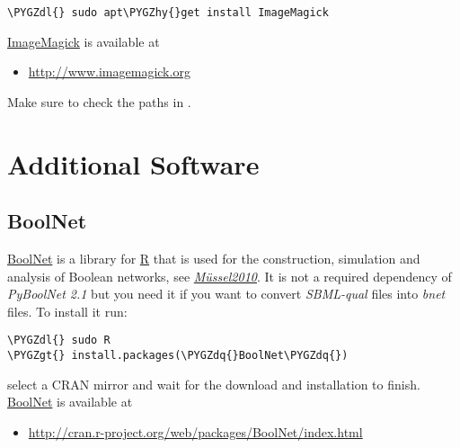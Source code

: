 \documentclass[letterpaper,10pt,english]{sphinxmanual}
\def\PYGZgt{\char`\>}
\def\PYGZdl{\char`\$}
\def\PYGZhy{\char`\-}
\def\PYGZdq{\char`\"}
\begin{document}
\begin{Verbatim}[commandchars=\\\{\}]
\PYGZdl{} sudo apt\PYGZhy{}get install ImageMagick
\end{Verbatim}

\href{http://www.imagemagick.org/script/index.php}{ImageMagick} is available at
\begin{itemize}
\item {} 
\href{http://www.imagemagick.org}{http://www.imagemagick.org}

\end{itemize}

Make sure to check the paths in .


\section{Additional Software}
\label{Installation:additional-software}

\subsection{BoolNet}
\label{Installation:boolnet}\label{Installation:installation-boolnet}
\href{https://cran.r-project.org/web/packages/BoolNet/index.html}{BoolNet} is a library for \href{https://www.r-project.org/}{R} that is used for the construction, simulation and analysis of Boolean networks, see {\hyperref[Bibliography:mussel2010]{\emph{Müssel2010}}}.
It is not a required dependency of \emph{PyBoolNet 2.1} but you need it if you want to convert \emph{SBML-qual} files into \emph{bnet} files.
To install it run:

\begin{Verbatim}[commandchars=\\\{\}]
\PYGZdl{} sudo R
\PYGZgt{} install.packages(\PYGZdq{}BoolNet\PYGZdq{})
\end{Verbatim}

select a CRAN mirror and wait for the download and installation to finish.
\href{https://cran.r-project.org/web/packages/BoolNet/index.html}{BoolNet} is available at
\begin{itemize}
\item {} 
\href{http://cran.r-project.org/web/packages/BoolNet/index.html}{http://cran.r-project.org/web/packages/BoolNet/index.html}

\end{itemize}
\end{document}
